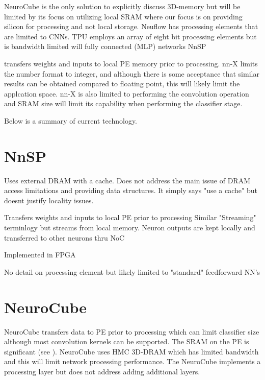 {{%
\iftrue

\vspace{5mm}
NeuroCube\cite{kim2016neurocube} is the only solution to explicitly discuss 3D-memory but will be limited by its focus on utilizing local SRAM where our focus is on
providing silicon for processing and not local storage.
Neuflow\cite{farabet2011neuflow} has processing elements that are limited to CNNs.
TPU\cite{jouppi2017datacenter} employs an array of eight bit processing elements but is bandwidth limited will fully connected (MLP) networks
NnSP{\cite{esmaeilzadeh2005nnsp} transfers weights and inputs to local PE memory prior to processing.
nn-X\cite{gokhale2014240} limits the number format to integer, and although there is some acceptance that similar
results can be obtained compared to floating point, this will likely limit the applcation space. 
nn-X is also limited to performing the convolution operation and SRAM size will limit its capability when performing the classifier stage.

Below is a summary of current technology.

\section[NnSP]{NnSP{\cite{esmaeilzadeh2005nnsp}}}

Uses external DRAM with a cache.
 Does not address the main issue of DRAM access limitations and providing data structures.
 It simply says "use a cache" but doesnt justify locality issues.

Transfers weights and inputs to local PE prior to processing
Similar "Streaming" terminlogy but streams from local memory.
Neuron outputs are kept locally and transferred to other neurons thru NoC

Implemented in FPGA

No detail on processing element but likely limited to "standard" feedforward NN's


\section[NeuroCube]{NeuroCube{\cite{kim2016neurocube}}}
NeuroCube\cite{kim2016neurocube} transfers data to PE prior to processing which can limit classifier size although most
convolution kernels can be supported.
The SRAM on the PE is significant (see ).
NeuroCube uses HMC 3D-DRAM which has limited bandwidth and this will limit network processing performance.
The NeuroCube implements a processing layer but does not address adding additional layers. 

}}}
